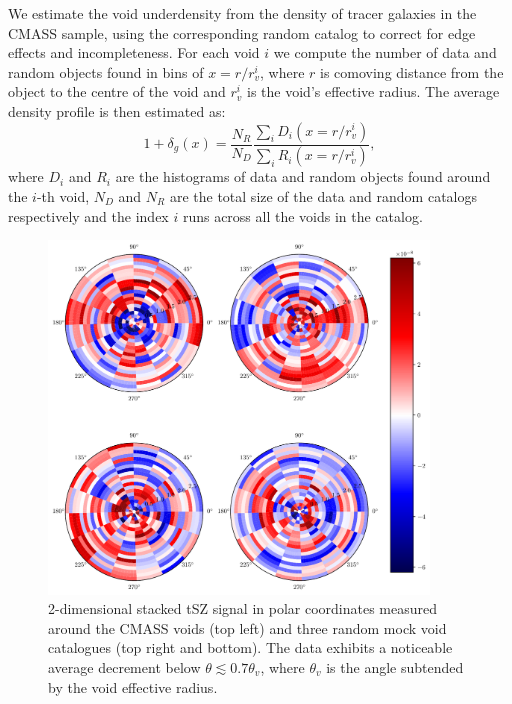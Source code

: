 \documentclass[twocolumn,amsfont,amssymb,amsmath, showpacs,balancelastpage, nofootinbib]{revtex4-1}
\begin{document}
      We estimate the void underdensity from the density of tracer galaxies in the CMASS
      sample, using the corresponding random catalog to correct for edge effects and
      incompleteness. For each void $i$ we compute the number of data and random objects
      found in bins of $x=r/r^i_v$, where $r$ is comoving distance from the object to
      the centre of the void and $r_v^i$ is the void's effective radius. The average
      density profile is then estimated as:
      \begin{equation}
        1+\delta_g(x)=\frac{N_R}{N_D}\frac{\sum_i D_i(x=r/r_v^i)}{\sum_i R_i(x=r/r_v^i)},
      \end{equation}
      where $D_i$ and $R_i$ are the histograms of data and random objects found around
      the $i$-th void, $N_D$ and $N_R$ are the total size of the data and random catalogs
      respectively and the index $i$ runs across all the voids in the catalog.
      \begin{figure}
        \centering
        \includegraphics[width=0.9\textwidth]{stacks_2d}
        \caption{2-dimensional stacked tSZ signal in polar coordinates measured around the CMASS voids
                 (top left) and three random mock void catalogues (top right and bottom). The data
                 exhibits a noticeable average decrement below $\theta\lesssim0.7\theta_v$, where
                 $\theta_v$ is the angle subtended by the void effective radius.}
        \label{fig:stacks_2d}
      \end{figure}
      
\end{document}
